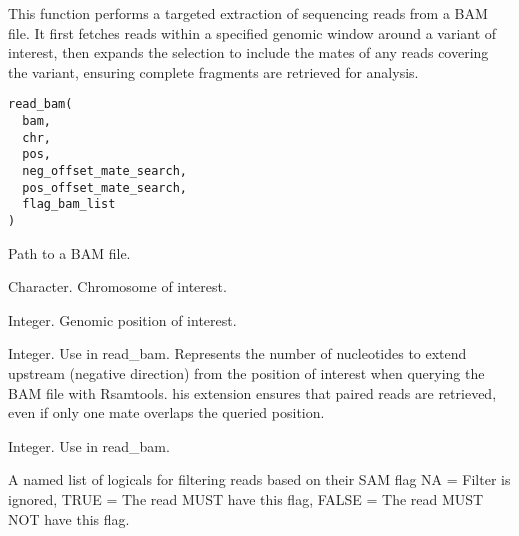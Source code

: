 \documentclass[a4paper]{book}
\begin{document}
%
\begin{Description}
This function performs a targeted extraction of sequencing reads from a BAM file. It first fetches reads
within a specified genomic window around a variant of interest, then expands the selection to include the mates of
any reads covering the variant, ensuring complete fragments are retrieved for analysis.
\end{Description}
%
\begin{Usage}
\begin{verbatim}
read_bam(
  bam,
  chr,
  pos,
  neg_offset_mate_search,
  pos_offset_mate_search,
  flag_bam_list
)
\end{verbatim}
\end{Usage}
%
\begin{Arguments}
\begin{ldescription}
\item[\code{bam}] Path to a BAM file.

\item[\code{chr}] Character. Chromosome of interest.

\item[\code{pos}] Integer. Genomic position of interest.

\item[\code{neg\_offset\_mate\_search}] Integer. Use in read\_bam.
Represents the number of nucleotides to extend upstream (negative direction)
from the position of interest when querying the BAM file with Rsamtools.
his extension ensures that paired reads are retrieved, even if only one mate
overlaps the queried position.

\item[\code{pos\_offset\_mate\_search}] Integer. Use in read\_bam.

\item[\code{flag\_bam\_list}] A named list of logicals for filtering reads based on their SAM flag
NA = Filter is ignored, TRUE = The read MUST have this flag, FALSE = The read MUST NOT have this flag.
\end{ldescription}
\end{Arguments}
%
\end{document}

